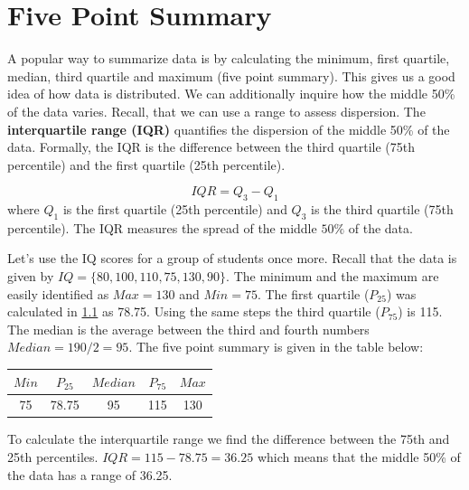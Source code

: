 \documentclass[
  11pt,
  letterpaper,
  DIV=11,
  numbers=noendperiod,
  oneside,
  open=any]{scrreprt}
\begin{document}
\section{Five Point Summary}\label{five-point-summary}

A popular way to summarize data is by calculating the minimum, first
quartile, median, third quartile and maximum (five point summary). This
gives us a good idea of how data is distributed. We can additionally
inquire how the middle 50\% of the data varies. Recall, that we can use
a range to assess dispersion. The \textbf{interquartile range (IQR)}
quantifies the dispersion of the middle 50\% of the data. Formally, the
IQR is the difference between the third quartile (75th percentile) and
the first quartile (25th percentile).

\begin{bsformula}

\[IQR = Q_3 - Q_1\] where \(Q_1\) is the first quartile (25th
percentile) and \(Q_3\) is the third quartile (75th percentile). The IQR
measures the spread of the middle \(50\%\) of the data.

\end{bsformula}

\begin{bsexample}[Example]

Let's use the IQ scores for a group of students once more. Recall that
the data is given by \(IQ=\{80,100,110,75,130,90\}\). The minimum and
the maximum are easily identified as \(Max=130\) and \(Min=75\). The
first quartile (\(P_{25}\)) was calculated in \hyperref[.quartiles]{1.1}
as 78.75. Using the same steps the third quartile (\(P_{75}\)) is 115.
The median is the average between the third and fourth numbers
\(Median=190/2=95\). The five point summary is given in the table below:

\begin{center}
\begin{tabular}{ccccc}
\toprule
\(Min\) & \(P_{25}\) & \(Median\) & \(P_{75}\) & \(Max\) \\
\midrule
75 & 78.75 & 95 & 115 & 130 \\
\bottomrule
\end{tabular}
\end{center}

To calculate the interquartile range we find the difference between the
75th and 25th percentiles. \(IQR=115-78.75=36.25\) which means that the
middle 50\% of the data has a range of 36.25.

\end{bsexample}
\end{document}
